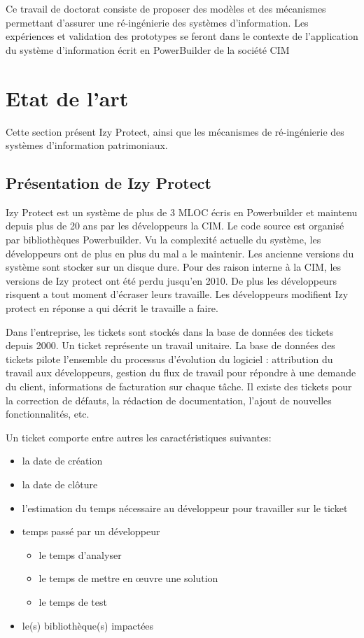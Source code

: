 \documentclass[a4paper]{article}
\begin{document}
Ce travail de doctorat consiste de proposer des modèles et des mécanismes permettant d'assurer
une ré-ingénierie des systèmes d'information. Les expériences et validation des prototypes se feront dans le contexte de l'application du système d'information écrit en PowerBuilder de la société CIM
\section{Etat de l'art}
\label{sec:stateOfTheArt}

Cette section présent Izy Protect, ainsi que les mécanismes de ré-ingénierie des systèmes d'information patrimoniaux.
\subsection{Présentation de Izy Protect}
\label{sec:izyProtect}
Izy Protect est un système de plus de 3 MLOC écris en Powerbuilder et maintenu depuis plus de 20 ans par les développeurs la CIM. Le code source est organisé par bibliothèques Powerbuilder.
Vu la complexité actuelle du système, les développeurs ont de plus en plus du mal a le maintenir. Les ancienne versions du système sont stocker sur un disque dure. Pour des raison interne à la CIM, les versions de Izy protect ont été perdu jusqu'en 2010.  De plus les développeurs risquent a tout moment d'écraser leurs travaille. Les développeurs modifient Izy protect en réponse a qui décrit le travaille a faire. 

Dans l'entreprise, les tickets sont stockés dans la base de données des tickets depuis 2000.
Un ticket représente un travail unitaire.
La base de données des tickets pilote l'ensemble du processus d'évolution du logiciel : attribution du travail aux développeurs, gestion du flux de travail pour répondre à une demande du client, informations de facturation sur chaque tâche.
Il existe des tickets pour la correction de défauts, la rédaction de documentation, l'ajout de nouvelles fonctionnalités, etc. 

Un ticket comporte entre autres les caractéristiques suivantes:

\begin{itemize}
\item  la date de création
\item la date de clôture
\item l'estimation du temps nécessaire au développeur pour travailler sur le ticket
\item temps passé par un développeur
  \begin{itemize}
  \item le temps d'analyser
  \item le temps de mettre en œuvre une solution
  \item le temps de test
  \end{itemize}
  \item le(s) bibliothèque(s) impactées
\end{itemize}
\end{document}
